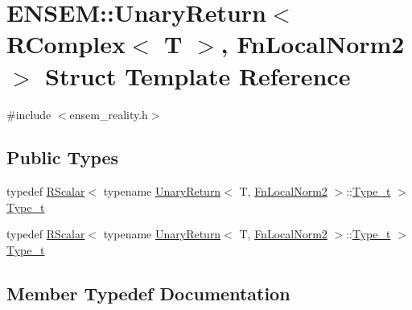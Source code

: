 \hypertarget{structENSEM_1_1UnaryReturn_3_01RComplex_3_01T_01_4_00_01FnLocalNorm2_01_4}{}\section{E\+N\+S\+EM\+:\+:Unary\+Return$<$ R\+Complex$<$ T $>$, Fn\+Local\+Norm2 $>$ Struct Template Reference}
\label{structENSEM_1_1UnaryReturn_3_01RComplex_3_01T_01_4_00_01FnLocalNorm2_01_4}


{\ttfamily \#include $<$ensem\+\_\+reality.\+h$>$}

\subsection*{Public Types}
\begin{DoxyCompactItemize}
\item 
typedef \mbox{\hyperlink{classENSEM_1_1RScalar}{R\+Scalar}}$<$ typename \mbox{\hyperlink{structENSEM_1_1UnaryReturn}{Unary\+Return}}$<$ T, \mbox{\hyperlink{structENSEM_1_1FnLocalNorm2}{Fn\+Local\+Norm2}} $>$\+::\mbox{\hyperlink{structENSEM_1_1UnaryReturn_3_01RComplex_3_01T_01_4_00_01FnLocalNorm2_01_4_acf4480dbc7c87e67898043db4bd45a41}{Type\+\_\+t}} $>$ \mbox{\hyperlink{structENSEM_1_1UnaryReturn_3_01RComplex_3_01T_01_4_00_01FnLocalNorm2_01_4_acf4480dbc7c87e67898043db4bd45a41}{Type\+\_\+t}}
\item 
typedef \mbox{\hyperlink{classENSEM_1_1RScalar}{R\+Scalar}}$<$ typename \mbox{\hyperlink{structENSEM_1_1UnaryReturn}{Unary\+Return}}$<$ T, \mbox{\hyperlink{structENSEM_1_1FnLocalNorm2}{Fn\+Local\+Norm2}} $>$\+::\mbox{\hyperlink{structENSEM_1_1UnaryReturn_3_01RComplex_3_01T_01_4_00_01FnLocalNorm2_01_4_acf4480dbc7c87e67898043db4bd45a41}{Type\+\_\+t}} $>$ \mbox{\hyperlink{structENSEM_1_1UnaryReturn_3_01RComplex_3_01T_01_4_00_01FnLocalNorm2_01_4_acf4480dbc7c87e67898043db4bd45a41}{Type\+\_\+t}}
\end{DoxyCompactItemize}


\subsection{Member Typedef Documentation}
\mbox{\label{structENSEM_1_1UnaryReturn_3_01RComplex_3_01T_01_4_00_01FnLocalNorm2_01_4_acf4480dbc7c87e67898043db4bd45a41}} 

